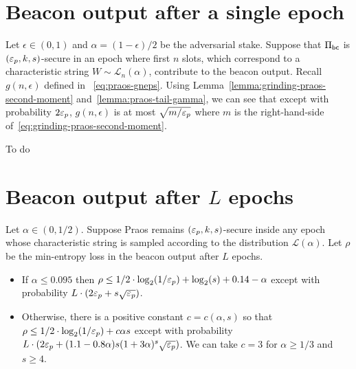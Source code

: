 \section{Beacon output after a single epoch}
Let $\epsilon \in (0,1)$ and $\alpha = (1-\epsilon)/2$ be the adversarial stake.
Suppose that $\Pi_\mathsf{bc}$ is $(\mathsf{\varepsilon}_p, k, s)$-secure in an epoch 
where first $n$ slots, 
which correspond to a characteristic string $W \sim \mathcal{L}_n(\alpha)$, 
contribute to the beacon output.
Recall $g(n,\epsilon)$ defined in ~\eqref{eq:praos-gneps}.
Using Lemma~\ref{lemma:grinding-praos-second-moment} and~\ref{lemma:praos-tail-gamma}, 
we can see that except with probability $2\mathsf{\varepsilon}_p$, $g(n,\epsilon)$ is at most $\sqrt{m/\mathsf{\varepsilon}_p}$ 
where $m$ is the right-hand-side of~\eqref{eq:grinding-praos-second-moment}.

\begin{theorem}\label{thm:praos-gp-single-epoch}
  {\color{red}To do}
\end{theorem}


\section{Beacon output after $L$ epochs}\label{sec:thm-praos-multiepoch}\label{sec:proof-praos-theorem}



\begin{theorem}\label{thm:minentropy-loss-praos}  
  Let $\alpha \in (0, 1/2)$. 
  Suppose Praos 
  remains $(\mathsf{\varepsilon}_p, k, s)$-secure 
  inside any epoch 
  whose characteristic string is sampled 
  according to the distribution $\mathcal{L}(\alpha)$.
  Let $\rho$ be the min-entropy loss in 
  the beacon output after $L$ epochs. 
  \begin{itemize}
    \item If $\alpha \leq 0.095$ then 
    $\rho \leq 1/2 \cdot \log_2(1/\mathsf{\varepsilon}_p) + \log_2(s) + 0.14 - \alpha$ 
    except with probability $L \cdot (2 \mathsf{\varepsilon}_p + s \sqrt{\mathsf{\varepsilon}_p} )$.

    \item Otherwise, there is a positive constant $c = c(\alpha, s)$ so that 
    $\rho \leq 1/2 \cdot \log_2(1/\mathsf{\varepsilon}_p) + c \alpha s
    $ 
    except with probability $L \cdot (2 \mathsf{\varepsilon}_p + (1.1 - 0.8 \alpha) s (1+3\alpha)^s \sqrt{\mathsf{\varepsilon}_p} )$. 
    We can take $c = 3$ for $\alpha \geq 1/3$ and $s \geq 4$.
  \end{itemize}
\end{theorem}


